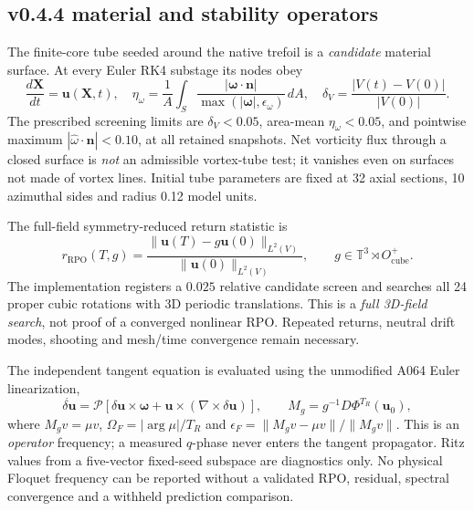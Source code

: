 \documentclass[11pt,a4paper]{article}
\begin{document}
\subsection*{v0.4.4 material and stability operators}
The finite-core tube seeded around the native trefoil is a \emph{candidate} material
surface.  At every Euler RK4 substage its nodes obey
\begin{equation}
\frac{d\mathbf X}{dt}=\mathbf u(\mathbf X,t),\quad
\eta_{\omega}=\frac1A\int_S\frac{|\bm\omega\cdot\mathbf n|}{\max(|\bm\omega|,\epsilon_{\omega})}\,dA,\quad
\delta_V=\frac{|V(t)-V(0)|}{|V(0)|}.
\end{equation}
The prescribed screening limits are $\delta_V<0.05$, area-mean
$\eta_{\omega}<0.05$, and pointwise maximum $|\widehat\omega\cdot\mathbf n|<0.10$,
at all retained snapshots.  Net vorticity flux through a closed surface is
\emph{not} an admissible vortex-tube test; it vanishes even on surfaces not
made of vortex lines.  Initial tube parameters are fixed at 32 axial
sections, 10 azimuthal sides and radius 0.12 model units.

The full-field symmetry-reduced return statistic is
\begin{equation}
 r_{\mathrm{RPO}}(T,g)=\frac{\|\mathbf u(T)-g\mathbf u(0)\|_{L^2(V)}}
 {\|\mathbf u(0)\|_{L^2(V)}},\qquad
 g\in\mathbb T^3\rtimes O^{+}_{\mathrm{cube}}.
\end{equation}
The implementation registers a $0.025$ relative candidate screen and searches
all 24 proper cubic rotations with 3D periodic translations.  This is a
\emph{full 3D-field search}, not proof of a converged nonlinear RPO.
Repeated returns, neutral drift modes, shooting and mesh/time convergence
remain necessary.

The independent tangent equation is evaluated using the unmodified A064
Euler linearization,
\begin{equation}
\dot{\delta\mathbf u}=\mathcal P[\delta\mathbf u\times\bm\omega+
\mathbf u\times(\nabla\times\delta\mathbf u)],\qquad
M_g=g^{-1}D\Phi^{T_R}(\mathbf u_0),
\end{equation}
where $M_gv=\mu v$, $\Omega_F=|\arg\mu|/T_R$ and
$\epsilon_F=\|M_gv-\mu v\|/\|M_gv\|$.  This is an \emph{operator}
frequency; a measured $q$-phase never enters the tangent propagator.
Ritz values from a five-vector fixed-seed subspace are diagnostics only.
No physical Floquet frequency can be reported without a validated RPO,
residual, spectral convergence and a withheld prediction comparison.

\end{document}
